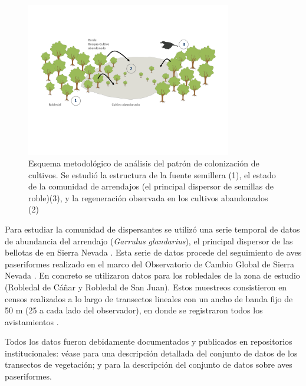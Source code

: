 \begin{figure}
    \centering
    \includegraphics[width=0.8\textwidth]{img/metodologia/metodologia-coloniza.pdf}
    \caption{Esquema metodológico de análisis del patrón de colonización de cultivos. Se estudió la estructura de la fuente semillera (1), el estado de la comunidad de arrendajos (el principal dispersor de semillas de roble)(3), y la regeneración observada en los cultivos abandonados (2)}
    \label{fig:metodologia:coloniza}
\end{figure}

Para estudiar la comunidad de dispersantes se utilizó una serie temporal de datos de abundancia del arrendajo (\emph{Garrulus glandarius}), el principal dispersor de las bellotas de \Qpy en Sierra Nevada \autocite[][]{Gomez2003ImpactVertebrate}. Esta serie de datos procede del seguimiento de aves paseriformes realizado en el marco del Observatorio de Cambio Global de Sierra Nevada \autocites{Zamoraetal2017MonitoringGlobal,BareaAzconetal2012PasseriformesOtras}. En concreto se utilizaron datos para los robledales de la zona de estudio (Robledal de Cáñar y Robledal de San Juan). Estos muestreos consistieron en censos realizados a lo largo de transectos lineales con un ancho de banda fijo de 50 m (25 a cada lado del observador), en donde se registraron todos los avistamientos \autocites{BareaAzconetal2012PasseriformesOtrasa, ZamoraBareaAzcon2015LongTermChanges}. 

Todos los datos fueron debidamente documentados y publicados en repositorios institucionales: véase \citet{PerezLuqueetal2015DatasetMIGRAME} para una descripción detallada del conjunto de datos de los transectos de vegetación; y \citet{PerezLuqueetal2016DatasetPasserine} para la descripción del conjunto de datos sobre aves paseriformes. 


